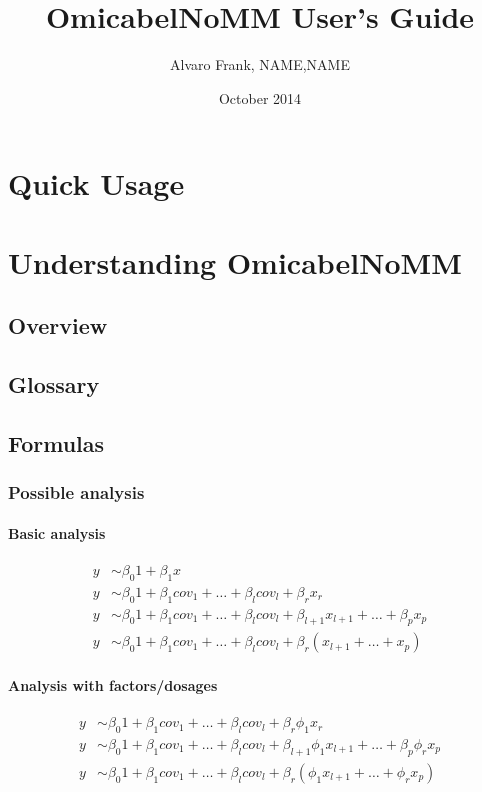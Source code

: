 \documentclass{report}
\begin{document}
\title{OmicabelNoMM User's Guide}
\author{Alvaro Frank, NAME,NAME}
\date{October 2014}
\maketitle


\chapter{Quick Usage}


\chapter{Understanding OmicabelNoMM}

\section{Overview}

\section{Glossary}

\section{Formulas}

\subsection{Possible analysis}

\subsubsection{Basic analysis}
\begin{align}
y &\sim \beta_0 1 + \beta_1 x \\
y &\sim \beta_0 1 + \beta_1 cov_1 + \dots + \beta_l cov_l + \beta_r x_r\\
y &\sim \beta_0 1 + \beta_1 cov_1 + \dots + \beta_l cov_l + \beta_{l+1} x_{l+1}  + \dots + \beta_p x_p\\
y &\sim \beta_0 1 + \beta_1 cov_1 + \dots + \beta_l cov_l + \beta_{r} \left(x_{l+1}  + \dots +  x_p\right)
\end{align}

\subsubsection{Analysis with factors/dosages}
\begin{align}
y &\sim \beta_0 1 + \beta_1 cov_1 + \dots + \beta_l cov_l + \beta_r \phi_1 x_r\\
y &\sim \beta_0 1 + \beta_1 cov_1 + \dots + \beta_l cov_l + \beta_{l+1}  \phi_1 x_{l+1}  + \dots + \beta_p  \phi_r x_p\\
y &\sim \beta_0 1 + \beta_1 cov_1 + \dots + \beta_l cov_l + \beta_{r} \left( \phi_1 x_{l+1}  + \dots +   \phi_r x_p\right)
\end{align}
\end{document}
